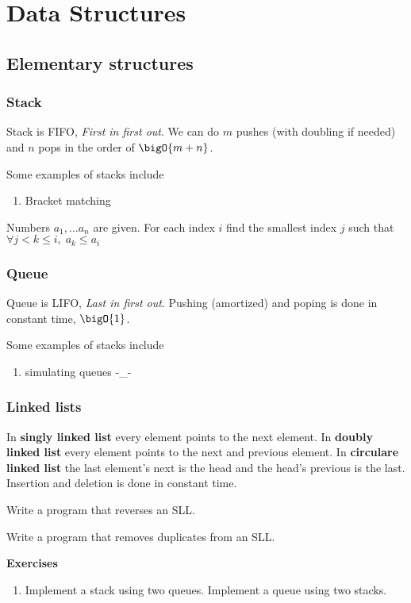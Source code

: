 \chapter{Data Structures}
\section{Elementary structures}
\subsection{Stack}
Stack is FIFO, \textit{First in first out}. We can do \(m\) pushes (with doubling if needed) and \(n\) pops in the order of \(\bigO{m + n}\).
\begin{example}
    Some examples of stacks include
    \begin{enumerate}
        \item Bracket matching
    \end{enumerate}
\end{example}

\begin{example}
    Numbers \(a_1 , \dots a_n\) are given. For each index \(i\) find the smallest index \(j\) such that \(\forall j < k \leq i, \; a_k \leq a_i\)
\end{example}

\subsection{Queue}
Queue is LIFO, \textit{Last in first out}.
Pushing (amortized) and poping is done in constant time, \(\bigO{1}\).
\begin{example}
    Some examples of stacks include
    \begin{enumerate}
        \item simulating queues -\_-
    \end{enumerate}
\end{example}

\subsection{Linked lists}
In \textbf{singly linked list} every element points to the next element. In \textbf{doubly linked list} every element points to the next and previous element. In \textbf{circulare linked list} the last element's next is the head and the head's previous is the last. Insertion and deletion is done in constant time.

\begin{example}
    Write a program that reverses an SLL.
\end{example}

\begin{example}
    Write a program that removes duplicates from an SLL.
\end{example}

{\Large\textbf{Exercises}}
\begin{enumerate}
    \item Implement a stack using two queues. Implement a queue using two stacks.
\end{enumerate}
\newpage